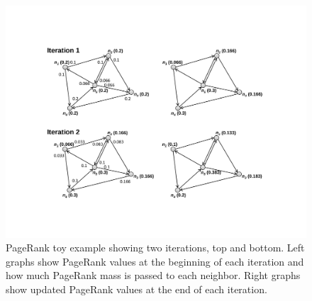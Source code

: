 \begin{figure}[t]
\begin{center}
\vspace{0.2cm}
\includegraphics[scale=0.6]{figures/fig-ch5-PageRank-toy-example.pdf}
\vspace{-0.3cm}
\end{center}
\caption{PageRank toy example showing two iterations, top and bottom.
  Left graphs show PageRank values at the beginning of each iteration
  and how much PageRank mass is passed to each neighbor.  Right graphs
  show updated PageRank values at the end of each iteration.}
\label{figure:chapter-graphs:PageRank-toy}
\end{figure}

